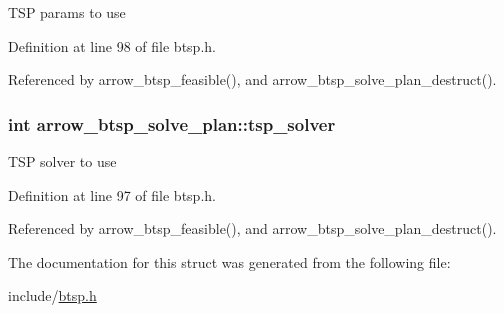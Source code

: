 TSP params to use 

Definition at line 98 of file btsp.h.

Referenced by arrow\_\-btsp\_\-feasible(), and arrow\_\-btsp\_\-solve\_\-plan\_\-destruct().\hypertarget{structarrow__btsp__solve__plan_911facf12673ddb5c3eb024fa12ee18d}{
\subsubsection[{tsp\_\-solver}]{\setlength{\rightskip}{0pt plus 5cm}int {\bf arrow\_\-btsp\_\-solve\_\-plan::tsp\_\-solver}}}
\label{structarrow__btsp__solve__plan_911facf12673ddb5c3eb024fa12ee18d}


TSP solver to use 

Definition at line 97 of file btsp.h.

Referenced by arrow\_\-btsp\_\-feasible(), and arrow\_\-btsp\_\-solve\_\-plan\_\-destruct().

The documentation for this struct was generated from the following file:\begin{CompactItemize}
\item 
include/\hyperlink{btsp_8h}{btsp.h}\end{CompactItemize}
